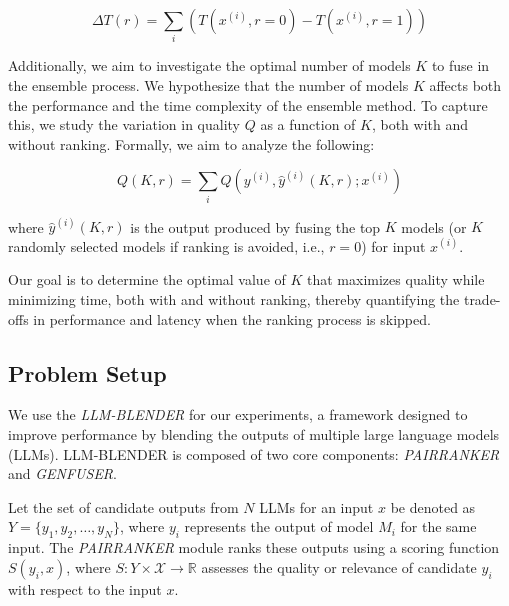 \documentclass[sigconf,authordraft]{acmart}
\begin{document}
\[
\Delta T(r) = \sum_{i} \left( T(x^{(i)}, r = 0) - T(x^{(i)}, r = 1) \right)
\]

Additionally, we aim to investigate the optimal number of models \( K \) to fuse in the ensemble process. We hypothesize that the number of models \( K \) affects both the performance and the time complexity of the ensemble method. To capture this, we study the variation in quality \( Q \) as a function of \( K \), both with and without ranking. Formally, we aim to analyze the following:

\[
Q(K, r) = \sum_{i} Q(y^{(i)}, \hat{y}^{(i)}(K, r); x^{(i)})
\]

where \( \hat{y}^{(i)}(K, r) \) is the output produced by fusing the top \( K \) models (or \( K \) randomly selected models if ranking is avoided, i.e., \( r = 0 \)) for input \( x^{(i)} \).

Our goal is to determine the optimal value of \( K \) that maximizes quality while minimizing time, both with and without ranking, thereby quantifying the trade-offs in performance and latency when the ranking process is skipped.

\subsection{Problem Setup}


We use the \textit{LLM-BLENDER} for our experiments, a framework designed to improve performance by blending the outputs of multiple large language models (LLMs). LLM-BLENDER is composed of two core components: \textit{PAIRRANKER} and \textit{GENFUSER}. 

Let the set of candidate outputs from \( N \) LLMs for an input \( x \) be denoted as \( Y = \{ y_1, y_2, \ldots, y_N \} \), where \( y_i \) represents the output of model \( M_i \) for the same input. The \textit{PAIRRANKER} module ranks these outputs using a scoring function \( S(y_i, x) \), where \( S: Y \times \mathcal{X} \to \mathbb{R} \) assesses the quality or relevance of candidate \( y_i \) with respect to the input \( x \).
\end{document}

